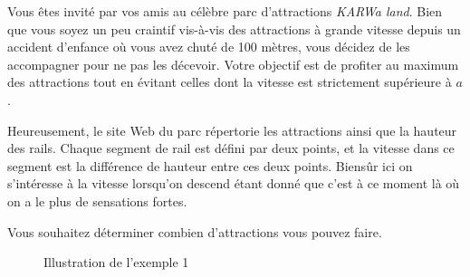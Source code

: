 \problemname{\problemyamlname}


Vous êtes invité par vos amis au célèbre parc d'attractions \textit{KARWa land}. Bien que vous soyez un peu craintif vis-à-vis des attractions à grande vitesse depuis un accident d'enfance où vous avez chuté de 100 mètres, vous décidez de les accompagner pour ne pas les décevoir. Votre objectif est de profiter au maximum des attractions tout en évitant celles dont la vitesse est strictement supérieure à $a$.

Heureusement, le site Web du parc répertorie les attractions ainsi que la hauteur des rails. Chaque segment de rail est défini par deux points, et la vitesse dans ce segment est la différence de hauteur entre ces deux points. Biensûr ici on s'intéresse à la vitesse lorsqu'on descend étant donné que c'est à ce moment là où on a le plus de sensations fortes.

Vous souhaitez déterminer combien d'attractions vous pouvez faire.

\begin{figure}[h]
    \centering
    \caption{Illustration de l'exemple 1}
\end{figure}

